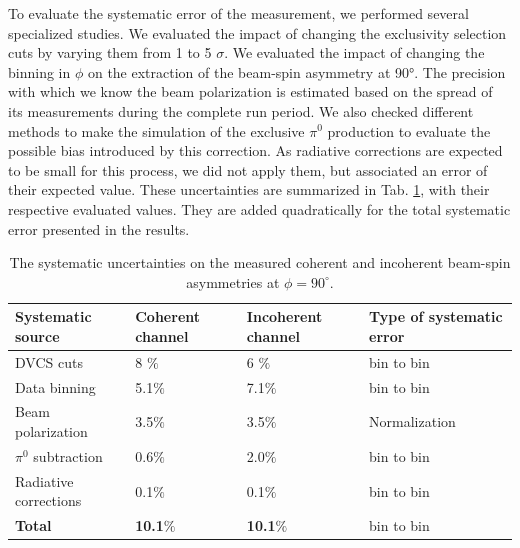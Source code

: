\documentclass[aps,prc,preprint,superscriptaddress]{revtex4}
\begin{document}
To evaluate the systematic error of the measurement, we performed several specialized studies. We 
evaluated the impact of changing the exclusivity selection cuts by varying them from 1 to 5 $\sigma$. 
We evaluated the impact of changing the binning in $\phi$ on the extraction of the beam-spin asymmetry
at 90°. The precision with which we know the beam polarization is estimated based on the spread 
of its measurements during the complete run period. We also checked different methods to make the 
simulation of the exclusive $\pi^0$ production to evaluate the 
possible bias introduced by this correction. As radiative corrections are expected to be small
for this process, we did not apply them, but associated an error of their expected value.
These uncertainties are summarized in Tab. \ref{Table:systematic_uncertainties}, with their respective 
evaluated values. They are added quadratically for the total systematic error presented in the results.

\begin{table}[tbp]
\begin{center}
	\begin{tabular}{|m{4cm}|m{2cm}<{\centering}|m{2.3cm}<{\centering}|m{3.7cm}<{\centering}|}
\hline
\bf Systematic source & \bf  Coherent channel  & \bf Incoherent channel & \bf Type of systematic 
error\\
\hline
DVCS cuts & 8 $\%$ &  6 $\%$ & bin to bin\\
\hline
Data binning & 5.1$\%$ & 7.1$\%$ &bin to bin\\
\hline
Beam polarization &  3.5$\%$ &  3.5$\%$& Normalization\\
\hline
$\pi^0$ subtraction &  0.6$\%$ &  2.0$\%$ &bin to bin\\
\hline
Radiative corrections &  0.1$\%$ & 0.1$\%$ & bin to bin\\
\hline
\textbf{Total} &  \textbf{10.1}$\%$ &   \textbf{10.1}$\%$ &bin to 
bin\\
\hline
\end{tabular}
\caption{The systematic uncertainties on the measured coherent and incoherent 
beam-spin asymmetries at $\phi = 90^{\circ}$.}
\label{Table:systematic_uncertainties}
\end{center}
\end{table}
\end{document}
